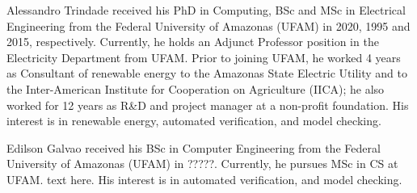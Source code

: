 \documentclass[10pt,journal,compsoc]{IEEEtran}
\begin{document}
\begin{IEEEbiography}
    {Alessandro Trindade}
received his PhD in Computing, BSc and MSc in Electrical Engineering from the Federal University of Amazonas (UFAM) in 2020, 1995 and 2015, respectively. Currently, he holds an Adjunct Professor position in the Electricity Department from UFAM. Prior to joining UFAM, he worked 4 years as Consultant of renewable energy to the Amazonas State Electric Utility and to the Inter-American Institute for Cooperation on Agriculture (IICA); he also worked for 12 years as R\&D and project manager at a non-profit foundation. His interest is in renewable energy, automated verification, and model checking.
\end{IEEEbiography}
%
%
\begin{IEEEbiography}
    {Edilson Galvao}
received his BSc in Computer Engineering from the Federal University of Amazonas (UFAM) in ?????. Currently, he pursues MSc in CS at UFAM. text here. His interest is in automated verification, and model checking.
\end{IEEEbiography}
\end{document}
